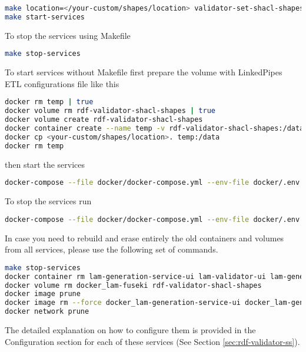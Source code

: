 \begin{lstlisting}[language=bash,]
make location=</your-custom/shapes/location> validator-set-shacl-shapes
make start-services
\end{lstlisting}

To stop the services using Makefile

\begin{lstlisting}[language=bash,]
make stop-services
\end{lstlisting}

To start services without Makefile first prepare the volume with LinkedPipes ETL configurations file like this

\begin{lstlisting}[language=bash,]
docker rm temp | true
docker volume rm rdf-validator-shacl-shapes | true
docker volume create rdf-validator-shacl-shapes
docker container create --name temp -v rdf-validator-shacl-shapes:/data busybox
docker cp <your-custom/shapes/location>. temp:/data
docker rm temp
\end{lstlisting}

then start the services

\begin{lstlisting}[language=bash,]
docker-compose --file docker/docker-compose.yml --env-file docker/.env up -d
\end{lstlisting}

To stop the services run

\begin{lstlisting}[language=bash,]
docker-compose --file docker/docker-compose.yml --env-file docker/.env down
\end{lstlisting}

In case you need to rebuild and erase entirely the old containers and volumes from all services, please use the following set of commands.

\begin{lstlisting}[language=bash,]
make stop-services
docker container rm lam-generation-service-ui lam-validator-ui lam-generation-service-api lam-validator-api lam-fuseki
docker volume rm docker_lam-fuseki rdf-validator-shacl-shapes
docker image prune
docker image rm --force docker_lam-generation-service-ui docker_lam-generation-service-api docker_lam-validator-ui docker_lam-validator-api
docker network prune
\end{lstlisting}

The detailed explanation on how to configure them is provided in the Configuration section for each of these services (See Section \ref{sec:rdf-validator-ss}).

